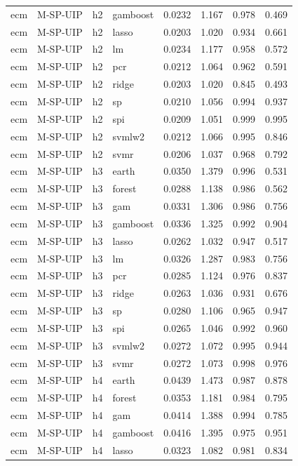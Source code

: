 \begin{ThreePartTable}
\begin{longtable}[t]{llclcccc}
ecm & M-SP-UIP & h2 & gamboost & 0.0232 & 1.167 & 0.978 & 0.469\\
ecm & M-SP-UIP & h2 & lasso & 0.0203 & 1.020 & 0.934 & 0.661\\
ecm & M-SP-UIP & h2 & lm & 0.0234 & 1.177 & 0.958 & 0.572\\
ecm & M-SP-UIP & h2 & pcr & 0.0212 & 1.064 & 0.962 & 0.591\\
ecm & M-SP-UIP & h2 & ridge & 0.0203 & 1.020 & 0.845 & 0.493\\
ecm & M-SP-UIP & h2 & sp & 0.0210 & 1.056 & 0.994 & 0.937\\
ecm & M-SP-UIP & h2 & spi & 0.0209 & 1.051 & 0.999 & 0.995\\
ecm & M-SP-UIP & h2 & svmlw2 & 0.0212 & 1.066 & 0.995 & 0.846\\
ecm & M-SP-UIP & h2 & svmr & 0.0206 & 1.037 & 0.968 & 0.792\\
\addlinespace
ecm & M-SP-UIP & h3 & earth & 0.0350 & 1.379 & 0.996 & 0.531\\
ecm & M-SP-UIP & h3 & forest & 0.0288 & 1.138 & 0.986 & 0.562\\
ecm & M-SP-UIP & h3 & gam & 0.0331 & 1.306 & 0.986 & 0.756\\
ecm & M-SP-UIP & h3 & gamboost & 0.0336 & 1.325 & 0.992 & 0.904\\
ecm & M-SP-UIP & h3 & lasso & 0.0262 & 1.032 & 0.947 & 0.517\\
ecm & M-SP-UIP & h3 & lm & 0.0326 & 1.287 & 0.983 & 0.756\\
ecm & M-SP-UIP & h3 & pcr & 0.0285 & 1.124 & 0.976 & 0.837\\
ecm & M-SP-UIP & h3 & ridge & 0.0263 & 1.036 & 0.931 & 0.676\\
ecm & M-SP-UIP & h3 & sp & 0.0280 & 1.106 & 0.965 & 0.947\\
ecm & M-SP-UIP & h3 & spi & 0.0265 & 1.046 & 0.992 & 0.960\\
ecm & M-SP-UIP & h3 & svmlw2 & 0.0272 & 1.072 & 0.995 & 0.944\\
ecm & M-SP-UIP & h3 & svmr & 0.0272 & 1.073 & 0.998 & 0.976\\
\addlinespace
ecm & M-SP-UIP & h4 & earth & 0.0439 & 1.473 & 0.987 & 0.878\\
ecm & M-SP-UIP & h4 & forest & 0.0353 & 1.181 & 0.984 & 0.795\\
ecm & M-SP-UIP & h4 & gam & 0.0414 & 1.388 & 0.994 & 0.785\\
ecm & M-SP-UIP & h4 & gamboost & 0.0416 & 1.395 & 0.975 & 0.951\\
ecm & M-SP-UIP & h4 & lasso & 0.0323 & 1.082 & 0.981 & 0.834\\

\end{longtable}
\end{ThreePartTable}
